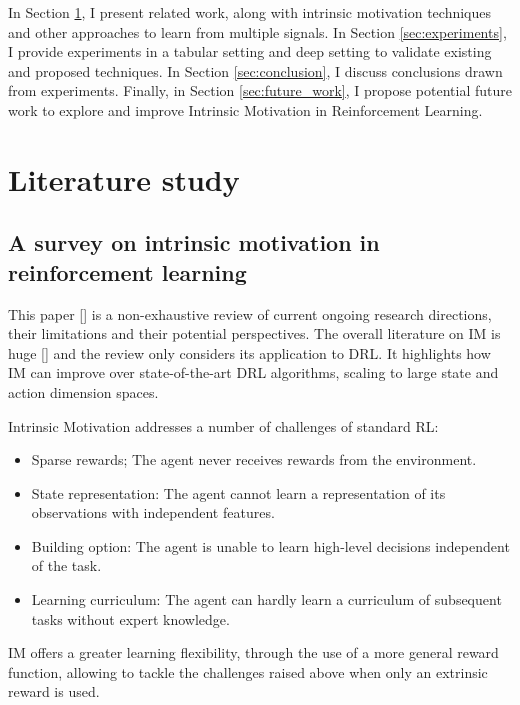 \documentclass[conference]{IEEEtran}
\begin{document}
In Section \ref{sec:literature_study}, I present related work, along with intrinsic motivation techniques and other approaches to learn from multiple signals. In Section \ref{sec:experiments}, I provide experiments in a tabular setting and deep setting to validate existing and proposed techniques. In Section \ref{sec:conclusion}, I discuss conclusions drawn from experiments. Finally, in Section \ref{sec:future_work}, I propose potential future work to explore and improve Intrinsic Motivation in Reinforcement Learning.

\section{Literature study} \label{sec:literature_study}

\subsection{A survey on intrinsic motivation in reinforcement learning}

This paper [\cite{aubret2019survey}] is a non-exhaustive review of current ongoing research directions, their limitations and their potential perspectives. The overall literature on IM is huge [\cite{barto2013intrinsic}] and the review only considers its application to DRL. It highlights how IM can improve over state-of-the-art DRL algorithms, scaling to large state and action dimension spaces.

Intrinsic Motivation addresses a number of challenges of standard RL:
\begin{itemize}
    \item Sparse rewards; The agent never receives rewards from the environment.
    \item State representation: The agent cannot learn a representation of its observations with independent features.
    \item Building option: The agent is unable to learn high-level decisions independent of the task.
    \item Learning curriculum: The agent can hardly learn a curriculum of subsequent tasks without expert knowledge.
\end{itemize}

IM offers a greater learning flexibility, through the use of a more general reward function, allowing to tackle the challenges raised above when only an extrinsic reward is used.
\end{document}
